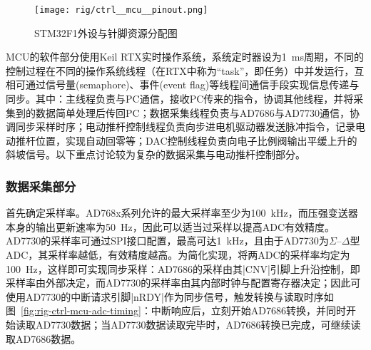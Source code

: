 \begin{figure}[tbhp]
\centering
\texttt{[image: rig/ctrl\_\_mcu\_\_pinout.png]}
\caption{STM32F1外设与针脚资源分配图}
\label{fig:rig-ctrl-mcu-pinout}
\end{figure}

MCU的软件部分使用Keil RTX实时操作系统，系统定时器设为\SI{1}{\milli\second}周期，不同的控制过程在不同的操作系统线程（在RTX中称为``task''，即任务）中并发运行，互相可通过信号量(semaphore)、事件(event flag)等线程间通信手段实现信息传递与同步。其中：主线程负责与PC通信，接收PC传来的指令，协调其他线程，并将采集到的数据简单处理后传回PC；数据采集线程负责与AD7686与AD7730通信，协调同步采样时序；电动推杆控制线程负责向步进电机驱动器发送脉冲指令，记录电动推杆位置，实现自动回零等；DAC控制线程负责向电子比例阀输出平缓上升的斜坡信号。以下重点讨论较为复杂的数据采集与电动推杆控制部分。

\subsubsection{数据采集部分}\label{sec:rig-ctrl-mcu-adc}

首先确定采样率。AD768x系列允许的最大采样率至少为\SI{100}{\kilo\hertz}，而压强变送器本身的输出更新速率为\SI{50}{\hertz}，因此可以适当过采样以提高ADC有效精度。AD7730的采样率可通过SPI接口配置，最高可达\SI{1}{\kilo\hertz}，且由于AD7730为$\Sigma$--$\Delta$型ADC，其采样率越低，有效精度越高。为简化实现，将两ADC的采样率均定为\SI{100}{\hertz}，这样即可实现同步采样：AD7686的采样由其\bverb|CNV|引脚上升沿控制，即采样率由外部决定，而AD7730的采样率由其内部时钟与配置寄存器决定；因此可使用AD7730的中断请求引脚\bverb|nRDY|作为同步信号，触发转换与读取时序如图~\ref{fig:rig-ctrl-mcu-adc-timing}：中断响应后，立刻开始AD7686转换，并同时开始读取AD7730数据；当AD7730数据读取完毕时，AD7686转换已完成，可继续读取AD7686数据。

